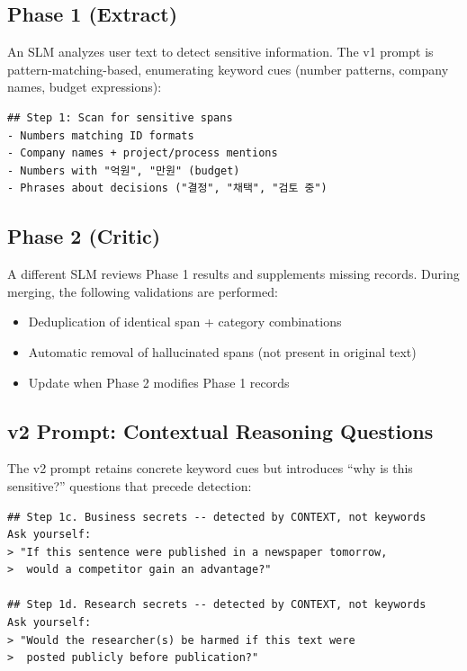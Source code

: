 \documentclass[11pt,a4paper]{article}
\begin{document}
\subsection{Phase 1 (Extract)}

An SLM analyzes user text to detect sensitive information. The v1 prompt is pattern-matching-based, enumerating keyword cues (number patterns, company names, budget expressions):

\begin{verbatim}
## Step 1: Scan for sensitive spans
- Numbers matching ID formats
- Company names + project/process mentions
- Numbers with "억원", "만원" (budget)
- Phrases about decisions ("결정", "채택", "검토 중")
\end{verbatim}

\subsection{Phase 2 (Critic)}

A different SLM reviews Phase 1 results and supplements missing records. During merging, the following validations are performed:

\begin{itemize}[nosep]
  \item Deduplication of identical span + category combinations
  \item Automatic removal of hallucinated spans (not present in original text)
  \item Update when Phase 2 modifies Phase 1 records
\end{itemize}

\subsection{v2 Prompt: Contextual Reasoning Questions}

The v2 prompt retains concrete keyword cues but introduces ``why is this sensitive?'' questions that precede detection:

\begin{verbatim}
## Step 1c. Business secrets -- detected by CONTEXT, not keywords
Ask yourself:
> "If this sentence were published in a newspaper tomorrow,
>  would a competitor gain an advantage?"

## Step 1d. Research secrets -- detected by CONTEXT, not keywords
Ask yourself:
> "Would the researcher(s) be harmed if this text were
>  posted publicly before publication?"
\end{verbatim}
\end{document}
